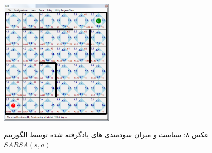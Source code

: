 \documentclass[10pt,a4paper]{article}
\begin{document}
\begin{figure}[H]
    \centering
    \includegraphics[width=0.5\textwidth]{r}
    \begin{center}
    \textarabic{عکس ۸: سیاست و میزان سودمندی های یادگرفته شده توسط الگوریتم $SARSA(s, a)$ }
    \end{center}
\end{figure}
\end{document}
